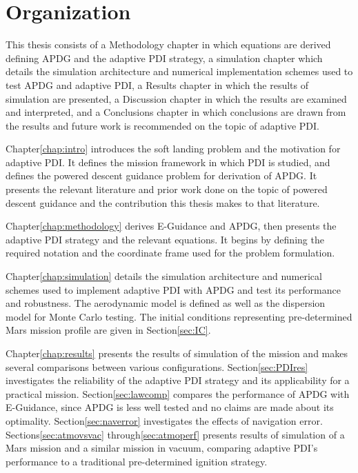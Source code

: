 \section{Organization}
This thesis consists of a Methodology chapter in which equations are derived defining APDG and the adaptive PDI strategy, a simulation chapter which details the simulation architecture and numerical implementation schemes used to test APDG and adaptive PDI, a Results chapter in which the results of simulation are presented, a Discussion chapter in which the results are examined and interpreted, and a Conclusions chapter in which conclusions are drawn from the results and future work is recommended on the topic of adaptive PDI.

Chapter\:\ref{chap:intro} introduces the soft landing problem and the motivation for adaptive PDI. It defines the mission framework in which PDI is studied, and defines the powered descent guidance problem for derivation of APDG. It presents the relevant literature and prior work done on the topic of powered descent guidance and the contribution this thesis makes to that literature.

Chapter\:\ref{chap:methodology} derives E-Guidance and APDG, then presents the adaptive PDI strategy and the relevant equations. It begins by defining the required notation and the coordinate frame used for the problem formulation.

Chapter\:\ref{chap:simulation} details the simulation architecture and numerical schemes used to implement adaptive PDI with APDG and test its performance and robustness. The aerodynamic model is defined as well as the dispersion model for Monte Carlo testing. The initial conditions representing pre-determined Mars mission profile are given in Section\:\ref{sec:IC}.

Chapter\:\ref{chap:results} presents the results of simulation of the mission and makes several comparisons between various configurations. Section\:\ref{sec:PDIres} investigates the reliability of the adaptive PDI strategy and its applicability for a practical mission. Section\:\ref{sec:lawcomp} compares the performance of APDG with E-Guidance, since APDG is less well tested and no claims are made about its optimality. Section\:\ref{sec:naverror} investigates the effects of navigation error. Sections\:\ref{sec:atmovsvac} through\:\ref{sec:atmoperf} presents results of simulation of a Mars mission and a similar mission in vacuum, comparing adaptive PDI's performance to a traditional pre-determined ignition strategy. 

